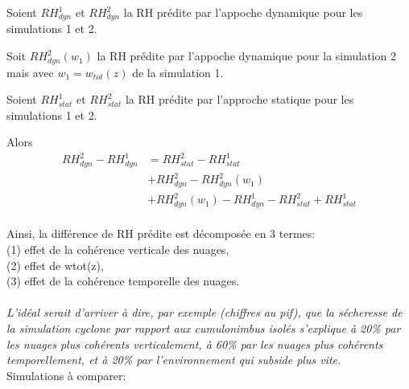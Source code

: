 \documentclass{article}
\begin{document}
\begin{list}{}{}
    \item Soient $RH_{dyn}^1$ et $RH_{dyn}^2$ la RH prédite par l'appoche dynamique pour les simulations 1 et 2. 
    \item Soit $RH_{dyn}^2(w_1)$ la RH prédite par l'appoche dynamique pour la simulation 2 mais avec $w_1 = w_{tot}(z)$ de la simulation 1. 
    \item Soient $RH_{stat}^1$ et $RH_{stat}^2$ la RH prédite par l'approche statique pour les simulations 1 et 2. 
\end{list}

Alors
~\\
\begin{align}
    RH_{dyn}^2-RH_{dyn}^1 &= RH_{stat}^2-RH_{stat}^1 \\
   &+ RH_{dyn}^2-RH_{dyn}^2(w_1) \\ 
   &+ RH_{dyn}^2(w_1)-RH_{dyn}^1-RH_{stat}^2+RH_{stat}^1 
\end{align}
~\\
Ainsi, la différence de RH prédite est décomposée en 3 termes:\\ 
(1) effet de la cohérence verticale des nuages, \\
(2) effet de wtot(z), \\ 
(3) effet de la cohérence temporelle des nuages.\\ ~\\
\textit{L'idéal serait d'arriver à dire, par exemple (chiffres au pif), que la sécheresse de la simulation cyclone par rapport aux cumulonimbus isolés s'explique à 20\% par les nuages plus cohérents verticalement, à 60\% par les nuages plus cohérents temporellement, et à 20\% par l'environnement qui subside plus vite.} \\

Simulations à comparer:
\end{document}
